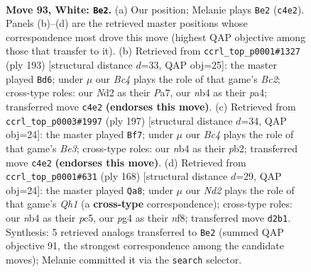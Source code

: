 \documentclass[11pt]{article}
\begin{document}
\clearpage

\begin{figure}[p]\centering
\begin{subfigure}{0.46\textwidth}\centering
\resizebox{\linewidth}{!}{%
\newchessgame
\chessboard[
  setfen={5r2/4kp2/6p1/4P3/bnB2Ppp/8/3N2KP/8 w - - 0 93},
  showmover=false,
  pgfstyle=straightmove, color=movearrow, markmove={c4-e2}
]}
\caption{}
\end{subfigure}\hfill
\begin{subfigure}{0.46\textwidth}\centering
\resizebox{\linewidth}{!}{%
\newchessgame
\chessboard[
  setfen={8/p1b2p2/5k1p/2p2p1P/P4P2/2P1K3/1P6/1B6 b - - 10 97},
  showmover=false,
  pgfstyle=straightmove, color=movearrow, markmove={c7-d6}
]}
\caption{}
\end{subfigure}
\\[4pt]
\begin{subfigure}{0.46\textwidth}\centering
\resizebox{\linewidth}{!}{%
\newchessgame
\chessboard[
  setfen={3B4/8/4b3/1p5k/1P3p1p/5P1P/1P4P1/6K1 b - - 69 99},
  showmover=false,
  pgfstyle=straightmove, color=movearrow, markmove={e6-f7}
]}
\caption{}
\end{subfigure}\hfill
\begin{subfigure}{0.46\textwidth}\centering
\resizebox{\linewidth}{!}{%
\newchessgame
\chessboard[
  setfen={5n2/5k2/3r1p2/2p2Pp1/6P1/2B1K1P1/8/7Q w - - 7 85},
  showmover=false,
  pgfstyle=straightmove, color=movearrow, markmove={h1-a8}
]}
\caption{}
\end{subfigure}
\caption{\textbf{Move 93, White: \texttt{Be2}.} (a) Our position; Melanie plays \texttt{Be2} (\texttt{c4e2}). Panels (b)--(d) are the retrieved master positions whose correspondence most drove this move (highest QAP objective among those that transfer to it). (b) Retrieved from \texttt{ccrl\_top\_p0001\#1327} (ply 193) [structural distance $d$=33, QAP obj=25]: the master played \texttt{Bd6}; under $\mu$ our \emph{Bc4} plays the role of that game's \emph{Bc2}; cross-type roles: our \emph{N}d2 as their \emph{P}a7, our \emph{n}b4 as their \emph{p}a4; transferred move \texttt{c4e2} \textbf{(endorses this move)}. (c) Retrieved from \texttt{ccrl\_top\_p0003\#1997} (ply 197) [structural distance $d$=34, QAP obj=24]: the master played \texttt{Bf7}; under $\mu$ our \emph{Bc4} plays the role of that game's \emph{Be3}; cross-type roles: our \emph{n}b4 as their \emph{p}b2; transferred move \texttt{c4e2} \textbf{(endorses this move)}. (d) Retrieved from \texttt{ccrl\_top\_p0001\#631} (ply 168) [structural distance $d$=29, QAP obj=24]: the master played \texttt{Qa8}; under $\mu$ our \emph{Nd2} plays the role of that game's \emph{Qh1} (a \textbf{cross-type} correspondence); cross-type roles: our \emph{n}b4 as their \emph{p}c5, our \emph{p}g4 as their \emph{n}f8; transferred move \texttt{d2b1}. Synthesis: 5 retrieved analogs transferred to \texttt{Be2} (summed QAP objective 91, the strongest correspondence among the candidate moves); Melanie committed it via the \texttt{search} selector.}
\label{fig:thought-m184}
\end{figure}
\end{document}
